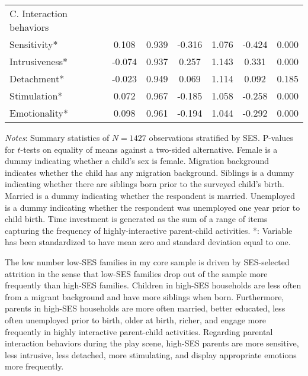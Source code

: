\begin{table}[!htbp]
\begin{threeparttable}
\begin{tabular}[t]{lcccccc}
			C. Interaction behaviors &&&&&&           \\
			\hspace{5mm}Sensitivity* & 0.108 & 0.939 & -0.316 & 1.076 & -0.424 & 0.000\\
			\hspace{5mm}Intrusiveness* & -0.074 & 0.937 & 0.257 & 1.143 & 0.331 & 0.000\\
			\hspace{5mm}Detachment* & -0.023 & 0.949 & 0.069 & 1.114 & 0.092 & 0.185\\
			\hspace{5mm}Stimulation* & 0.072 & 0.967 & -0.185 & 1.058 & -0.258 & 0.000\\
			\hspace{5mm}Emotionality* & 0.098 & 0.961 & -0.194 & 1.044 & -0.292 & 0.000\\
			\hline\hline
		\end{tabular}
	\begin{tablenotes}
		\small
		\item \textit{Notes}: Summary statistics of $N = 1427$ observations stratified by SES. P-values for $t$-tests on equality of means against a two-sided alternative. Female is a dummy indicating whether a child's sex is female. Migration background indicates whether the child has any migration background. Siblings is a dummy indicating whether there are siblings born prior to the surveyed child's birth. Married is a dummy indicating whether the respondent is married. Unemployed is a dummy indicating whether the respondent was unemployed one year prior to child birth. Time investment is generated as the sum of a range of items capturing the frequency of highly-interactive parent-child activities. *: Variable has been standardized to have mean zero and standard deviation equal to one.
	\end{tablenotes}
	\end{threeparttable}
\end{table}
%
The low number low-SES families in my core sample is driven by SES-selected attrition in the sense that low-SES families drop out of the sample more frequently than high-SES families. Children in high-SES households are less often from a migrant background and have more siblings when born. Furthermore, parents in high-SES households are more often married, better educated, less often unemployed prior to birth, older at birth, richer, and engage more frequently in highly interactive parent-child activities. Regarding parental interaction behaviors during the play scene, high-SES parents are more sensitive, less intrusive, less detached, more stimulating, and display appropriate emotions more frequently.
